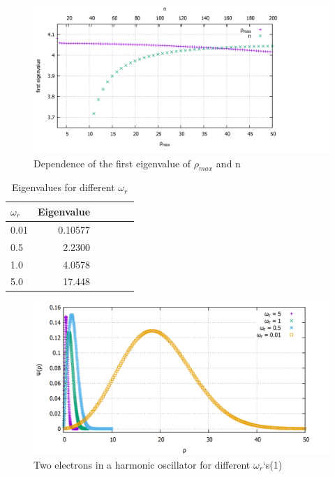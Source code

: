 \documentclass[10pt,a4paper]{article}
\begin{document}
\begin{figure}[h]
	\includegraphics[scale = 0.18]{rhomax_and_n_against_ev.png}
	\centering
	\caption{Dependence of the first eigenvalue of $\rho_{max}$ and n }
	\label{eigenvaluedependence}
\end{figure}

\begin{table}[h!]
	\centering
\begin{tabular}{|l|r|c|lrp{16cm}}\hline
	$\omega_{r}$ & Eigenvalue\\\hline
	0.01 & 0.10577\\
	0.5 & 2.2300\\
	1.0 & 4.0578\\
	5.0 & 17.448\\\hline
\end{tabular}
	\caption{Eigenvalues for different 	$\omega_{r}$}
	\label{ev2el}
\end{table}

\begin{figure}[h]
	\includegraphics[scale = 0.25]{2Electrons_comparison_thick.png}
	\centering
	\caption{Two electrons in a harmonic oscillator for different $\omega_{r}$`s(1) }
	\label{plot2el1}
	\end{figure}
	
\end{document}
